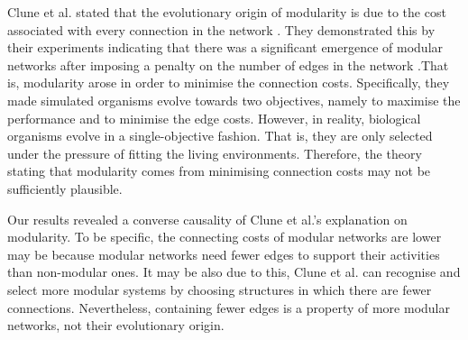 Clune et al. stated that the evolutionary origin of modularity is due to the cost associated with every connection in the network \cite{clune2013evolutionary}. They demonstrated this by their experiments indicating that there was a significant emergence of modular networks after imposing a penalty on the number of edges in the network \cite{clune2013evolutionary}.That is, modularity arose in order to minimise the connection costs. Specifically, they made simulated organisms evolve towards two objectives, namely to maximise the performance and to minimise the edge costs. However, in reality, biological organisms evolve in a single-objective fashion. That is, they are only selected under the pressure of fitting the living environments. Therefore, the theory stating that modularity comes from minimising connection costs may not be sufficiently plausible. 

Our results revealed a converse causality of Clune et al.'s explanation on modularity. To be specific, the connecting costs of modular networks are lower may be because modular networks need fewer edges to support their activities than non-modular ones. It may be also due to this, Clune et al. can recognise and select more modular systems by choosing structures in which there are fewer connections. Nevertheless, containing fewer edges is a property of more modular networks, not their evolutionary origin. 

